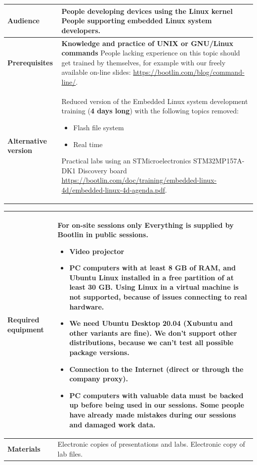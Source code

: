 \documentclass[a4paper,12pt,obeyspaces,spaces,hyphens]{article}
\begin{document}
{\begin{tabularx}{\textwidth}{|g|h|}
    {\bf Audience} & People developing devices using the Linux kernel
    \newline People supporting embedded Linux system developers. \\
    \hline

    {\bf Prerequisites} &
    {\bf Knowledge and practice of UNIX or GNU/Linux commands}
    \newline People lacking experience on this topic should get
    trained by themselves, for example with our freely available
    on-line slides:
    \newline \url{https://bootlin.com/blog/command-line/}. \\
    \hline

    {\bf Alternative version} & Reduced version of the Embedded Linux
    system development training ({\bf 4 days long}) with the following
    topics removed:
    \begin{itemize}
    \item Flash file system
    \item Real time
    \end{itemize}
    Practical labs using an STMicroelectronics STM32MP157A-DK1 Discovery board
    \url{https://bootlin.com/doc/training/embedded-linux-4d/embedded-linux-4d-agenda.pdf}. \\
    \hline

  \end{tabularx}

  \begin{tabularx}{\textwidth}{|g|h|}
    {\bf Required equipment} &
    {\bf For on-site sessions only}
    \newline Everything is supplied by Bootlin in public sessions.
    \begin{itemize}
    \item Video projector
    \item PC computers with at least 8 GB of RAM, and Ubuntu Linux
    installed in a {\bf free partition of at least 30 GB. Using Linux
      in a virtual machine is not supported}, because of issues
    connecting to real hardware.
    \item We need Ubuntu Desktop 20.04 (Xubuntu and
    other variants are fine). We don't support other
    distributions, because we can't test all possible package versions.
    \item {\bf Connection to the Internet} (direct or through the
    company proxy).
    \item {\bf PC computers with valuable data must be backed up}
    before being used in our sessions.  Some people have already made
    mistakes during our sessions and damaged work data.
    \end{itemize}\\
    \hline

    {\bf Materials} & Electronic copies of presentations and
    labs.
    \newline Electronic copy of lab files.\\
    \hline

\end{tabularx}}
\normalsize
\end{document}
